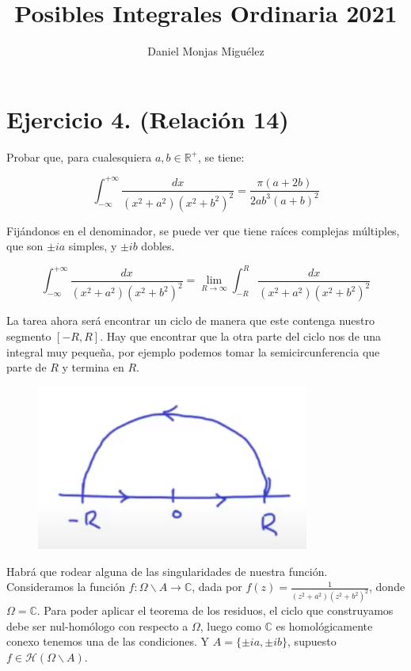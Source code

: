 \documentclass{article}
\author{Daniel Monjas Miguélez}
\title{Posibles Integrales Ordinaria 2021}
\begin{document}
\maketitle
\newpage

\section{Ejercicio 4. (Relación 14)}
Probar que, para cualesquiera $a,b\in \mathbb{R}^+$, se tiene:

\begin{equation*}
\int_{-\infty}^{+\infty} \frac{dx}{(x^2+a^2)(x^2+b^2)^2}=\frac{\pi (a+2b)}{2ab^3(a+b)^2}
\end{equation*}

Fijándonos en el denominador, se puede ver que tiene raíces complejas múltiples, que son $\pm ia$ simples, y $\pm ib$ dobles.

\[\int_{-\infty}^{+\infty} \frac{dx}{(x^2+a^2)(x^2+b^2)^2}=\lim_{R\to\infty}\int_{-R}^R \frac{dx}{(x^2+a^2)(x^2+b^2)^2}\]

La tarea ahora será encontrar un ciclo de manera que este contenga nuestro segmento $[-R,R]$. Hay que encontrar que la otra parte del ciclo nos de una integral muy pequeña, por ejemplo podemos tomar la semicircunferencia que parte de $R$ y termina en $R$.

\begin{figure}[h]
\centering
\includegraphics[scale=1,width=0.8\textwidth]{ciclo_ejer_4.png}
\end{figure}

Habrá que rodear alguna de las singularidades de nuestra función. \\

Consideramos la función $f:\Omega\backslash A\longrightarrow \mathbb{C}$, dada por $f(z)=\frac{1}{(z^2+a^2)(z^2+b^2)^2}$, donde $\Omega=\mathbb{C}$. Para poder aplicar el teorema de los residuos, el ciclo que construyamos debe ser nul-homólogo con respecto a $\Omega$, luego como $\mathbb{C}$ es homológicamente conexo tenemos una de las condiciones. Y $A=\{\pm ia,\pm ib\}$, supuesto $f\in \mathcal{H}(\Omega\backslash A)$. \\
\end{document}
